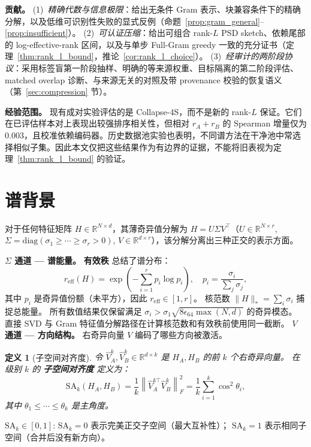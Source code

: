 \documentclass{article}
\newcommand{\reff}{\ensuremath{r_{\mathrm{eff}}}\xspace}
\newcommand{\SAk}{\ensuremath{\mathrm{SA}_k}\xspace}
\newcommand{\R}{\ensuremath{\mathbb{R}}}
\newcommand{\norm}[1]{\ensuremath{\left\lVert#1\right\rVert}}
\newtheorem{definition}{定义}
\begin{document}
\textbf{贡献。}
(1)~\emph{精确代数与信息极限}：给出无条件 Gram 表示、块兼容条件下的精确分解，以及低维可识别性失败的显式反例（命题~\ref{prop:gram_general}--\ref{prop:insufficient}）。
(2)~\emph{可认证压缩}：给出可组合 rank-$L$ PSD sketch、依赖尾部的 log-effective-rank 区间，以及与单步 Full-Gram greedy 一致的充分证书（定理~\ref{thm:rank_l_bound}，推论~\ref{cor:rank_l_choice}）。
(3)~\emph{经审计的两阶段协议}：采用标签盲第一阶段抽样、明确的等来源权重、目标隔离的第二阶段评估、matched overlap 诊断、与来源无关的对照及带 provenance 校验的恢复语义（第~\ref{sec:compression} 节）。

\textbf{经验范围。}
现有成对实验评估的是 Collapse-4S，而不是新的 rank-$L$ 保证。它们在已评估样本对上表现出较强排序相关性，但相对 $r_A{+}r_B$ 的 Spearman 增量仅为 $0.003$，且校准依赖编码器。历史数据池实验也表明，不同谱方法在干净池中常选择相似子集。因此本文仅把这些结果作为有边界的证据，不能将旧表视为定理~\ref{thm:rank_l_bound} 的验证。
\section{谱背景}
\label{sec:background}

对于任何特征矩阵 $H\in\R^{N\times d}$，其薄奇异值分解为 $H=U\Sigma V^\top$（$U\in\R^{N\times r}$, $\Sigma=\mathrm{diag}(\sigma_1\geq\cdots\geq\sigma_r>0)$,
$V\in\R^{d\times r}$），该分解分离出三种正交的表示方面。

\textbf{$\Sigma$ 通道 --- 谱能量。}
\textbf{有效秩} 总结了谱分布：
\begin{equation}
  \reff(H) = \exp\!\left(-\sum_{i=1}^r p_i \log p_i\right),
  \quad p_i = \frac{\sigma_i}{\sum_j \sigma_j},
  \label{eq:reff}
\end{equation}
其中 $p_i$ 是奇异值份额（未平方），因此 $r_{\mathrm{eff}}\in[1,r]$。
核范数 $\|H\|_*=\sum_i\sigma_i$ 捕捉总能量。
所有数值结果仅保留满足
$\sigma_i>\sigma_1\sqrt{8\epsilon_{64}\max(N,d)}$ 的奇异模态。
直接 SVD 与 Gram 特征值分解路径在计算核范数和有效秩前使用同一截断。
\textbf{$V$ 通道 --- 方向结构。}
右奇异向量 $V$ 编码了哪些方向被激活。
\begin{definition}[子空间对齐度]
\label{def:sa}
令 $\hat{V}_A^k,\hat{V}_B^k\in\R^{d\times k}$ 是 $H_A,H_B$ 的前 $k$ 个右奇异向量。
在级别 $k$ 的 \textbf{子空间对齐度} 定义为：
\begin{equation}
  \SAk(H_A,H_B) = \frac{1}{k}\norm{\hat{V}_A^{k\top}\hat{V}_B^k}_F^2
  = \frac{1}{k}\sum_{i=1}^k\cos^2\theta_i,
  \label{eq:sak}
\end{equation}
其中 $\theta_1\leq\cdots\leq\theta_k$ 是主角度。
\end{definition}
$\SAk\in[0,1]$: $\SAk=0$ 表示完美正交子空间（最大互补性）；
$\SAk=1$ 表示相同子空间（合并后没有新方向）。
\end{document}
